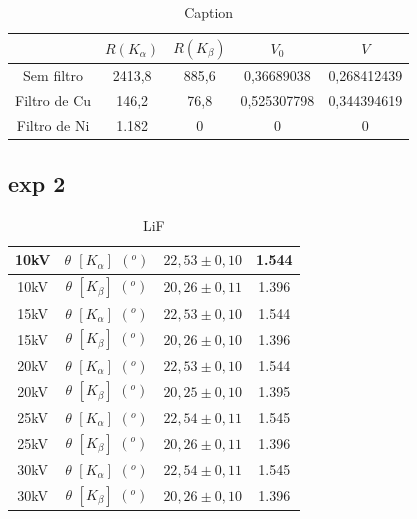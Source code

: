 \documentclass[article,12pt,openright,oneside,a4paper,brazil]{abntex2}
\begin{document}
\begin{table}[H]
    \centering
    \begin{tabular}{|c|c|c|c|c|}
    \hline
         & $R(K_\alpha)$ & $R(K_\beta)$ & $V_0$ & $V$ \\ \hline
        Sem filtro & 2413,8 & 885,6 & 0,36689038 & 0,268412439 \\ \hline
        Filtro de Cu & 146,2 & 76,8 & 0,525307798 & 0,344394619 \\ \hline
        Filtro de Ni & 1.182 & 0 & 0 & 0 \\ \hline 
    \end{tabular}
    \caption{Caption}
    \label{tab:my_label}
\end{table}

\subsection{exp 2}

\begin{table}[H]
    \centering
    \begin{tabular}{|c|c|c|c|}
        \hline
        10kV & $\theta$ $[K_\alpha]$ $(^o)$ & $22,53\pm0,10$ & 1.544\\ \hline
        10kV & $\theta$ $[K_\beta]$ $(^o)$ & $20,26\pm0,11$ & 1.396\\ \hline
        15kV & $\theta$ $[K_\alpha]$ $(^o)$ & $22,53\pm0,10$ & 1.544\\ \hline
        15kV & $\theta$ $[K_\beta]$ $(^o)$ & $20,26\pm0,10$ & 1.396\\ \hline
        20kV & $\theta$ $[K_\alpha]$ $(^o)$ & $22,53\pm0,10$ & 1.544\\ \hline
        20kV & $\theta$ $[K_\beta]$ $(^o)$ & $20,25\pm0,10$ & 1.395\\ \hline
        25kV & $\theta$ $[K_\alpha]$ $(^o)$ & $22,54\pm0,11$ & 1.545\\ \hline
        25kV & $\theta$ $[K_\beta]$ $(^o)$ & $20,26\pm0,11$ & 1.396\\ \hline
        30kV & $\theta$ $[K_\alpha]$ $(^o)$ & $22,54\pm0,11$ & 1.545\\ \hline
        30kV & $\theta$ $[K_\beta]$ $(^o)$ & $20,26\pm0,10$ & 1.396\\ \hline
    \end{tabular}
    \caption{LiF}
    \label{tab:my_label7}
\end{table}
\end{document}
